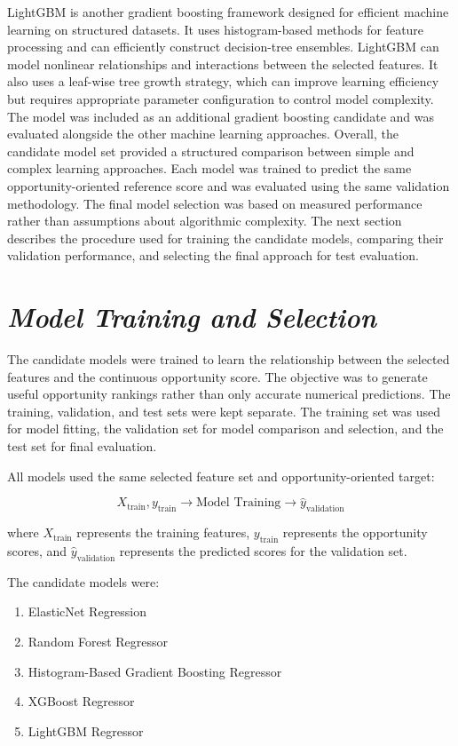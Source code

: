\documentclass[12pt,a4paper]{report}
\begin{document}
LightGBM is another gradient boosting framework designed for efficient machine learning on structured datasets. It uses histogram-based methods for feature processing and can efficiently construct decision-tree ensembles. LightGBM can model nonlinear relationships and interactions between the selected features. It also uses a leaf-wise tree growth strategy, which can improve learning efficiency but requires appropriate parameter configuration to control model complexity. The model was included as an additional gradient boosting candidate and was evaluated alongside the other machine learning approaches. Overall, the candidate model set provided a structured comparison between simple and complex learning approaches. Each model was trained to predict the same opportunity-oriented reference score and was evaluated using the same validation methodology. The final model selection was based on measured performance rather than assumptions about algorithmic complexity. The next section describes the procedure used for training the candidate models, comparing their validation performance, and selecting the final approach for test evaluation.

\section{\textit{Model Training and Selection}}
The candidate models were trained to learn the relationship between the selected features and the continuous opportunity score. The objective was to generate useful opportunity rankings rather than only accurate numerical predictions. The training, validation, and test sets were kept separate. The training set was used for model fitting, the validation set for model comparison and selection, and the test set for final evaluation.

All models used the same selected feature set and opportunity-oriented target:

\begin{equation}
X_{\text{train}}, y_{\text{train}}
\rightarrow
\text{Model Training}
\rightarrow
\hat{y}_{\text{validation}}
\end{equation}

where $X_{\text{train}}$ represents the training features, $y_{\text{train}}$ represents the opportunity scores, and $\hat{y}_{\text{validation}}$ represents the predicted scores for the validation set.

The candidate models were:

\begin{enumerate}
    \item ElasticNet Regression
    \item Random Forest Regressor
    \item Histogram-Based Gradient Boosting Regressor
    \item XGBoost Regressor
    \item LightGBM Regressor
\end{enumerate}
\end{document}
